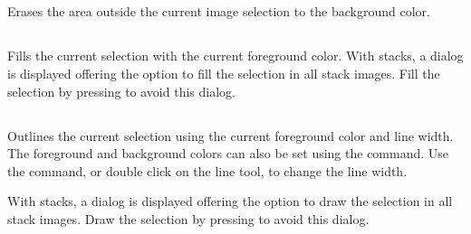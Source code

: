 \subsection{\protect{}\label{sub:Clear-Outside}}

Erases the area outside the current image selection to the background
color.




\subsection{\protect{}\label{sub:Fill-[f]}}

Fills the current selection with the current foreground color. With
stacks, a dialog is displayed offering the option to fill the selection
in all stack images. Fill the selection by pressing 
to avoid this dialog.




\subsection{\protect{}\label{sub:Draw-[d]}}

Outlines the current selection using the current foreground color
and line width. The foreground and background colors can also be set
using the 
command. Use the 
command, or double click on the line tool, to change the line width.

With stacks, a dialog is displayed offering the option to draw the
selection in all stack images. Draw the selection by pressing 
to avoid this dialog.




